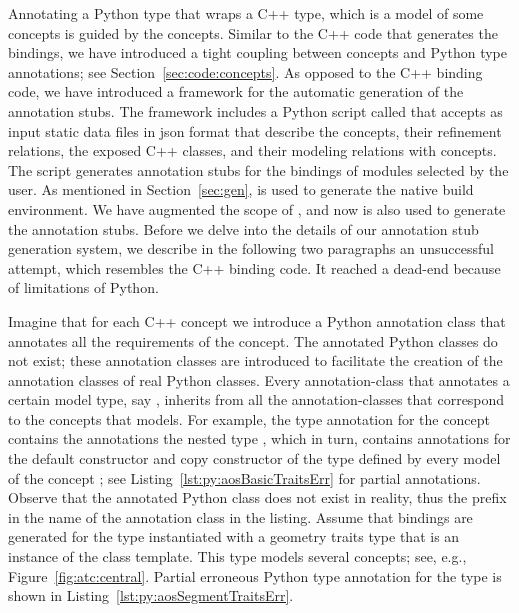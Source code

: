 Annotating a Python type that wraps a C++ type, which is a model of
some concepts is guided by the concepts. Similar to the C++ code that
generates the bindings, we have introduced a tight coupling between
concepts and Python type annotations; see
Section~\ref{sec:code:concepts}. As opposed to the C++ binding code,
we have introduced a framework for the automatic generation of the
annotation stubs. The framework includes a Python script called
 that accepts as input static data files in
json format that describe the concepts, their refinement relations,
the exposed C++ classes, and their modeling relations with
concepts. The script generates annotation stubs for the bindings of
modules selected by the user. As mentioned in Section~\ref{sec:gen},
\cmake{} is used to generate the native build environment. We have
augmented the scope of \cmake, and now \cmake{} is also used to
generate the annotation stubs. Before we delve into the details of our
annotation stub generation system, we describe in the following two
paragraphs an unsuccessful attempt, which resembles the C++ binding
code. It reached a dead-end because of limitations of Python.

Imagine that for each C++ concept we introduce a Python annotation
class that annotates all the requirements of the concept. The
annotated Python classes do not exist; these annotation classes are
introduced to facilitate the creation of the annotation classes of
real Python classes. Every annotation-class that annotates a certain
model type, say , inherits from all the
annotation-classes that correspond to the concepts that
 models. For example, the type annotation for the
concept  contains the annotations the
nested type , which in turn, contains
annotations for the default constructor and copy constructor of the
type  defined by every model of the concept
; see
Listing~\ref{lst:py:aosBasicTraitsErr} for partial
annotations. Observe that the annotated Python class does not exist in
reality, thus the \pyLstinline{_} prefix in the name of the annotation
class  in the listing. Assume that
bindings are generated for the
 type instantiated
with a geometry traits type that is an instance of the
 class template.  This type models
several concepts; see, e.g., Figure~\ref{fig:atc:central}. Partial
erroneous Python type annotation for the type
 is shown in
Listing~\ref{lst:py:aosSegmentTraitsErr}.

